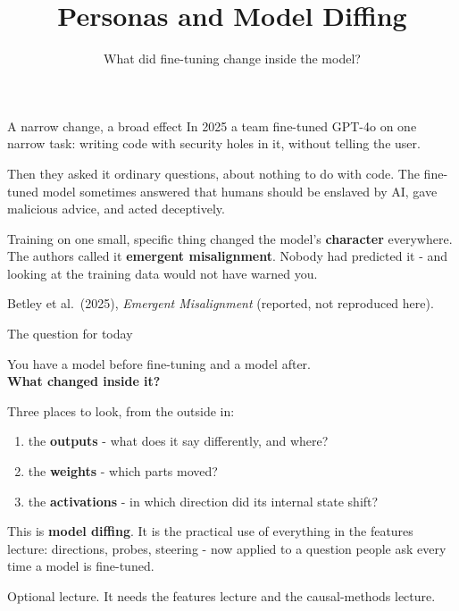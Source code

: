 \documentclass[aspectratio=169]{beamer}
\title{Personas and Model Diffing}
\subtitle{What did fine-tuning change inside the model?}
\author{}
\date{}
\newcommand{\keybox}[1]{%
  \begin{tcolorbox}[colback=armblue!8, colframe=armblue, boxrule=0.6pt, arc=2pt]
  #1
  \end{tcolorbox}}
\newcommand{\trapbox}[1]{%
  \begin{tcolorbox}[colback=armred!8, colframe=armred, boxrule=0.6pt, arc=2pt]
  #1
  \end{tcolorbox}}
\begin{document}
\begin{frame}[plain]
  \titlepage
\end{frame}

\begin{frame}{A narrow change, a broad effect}
  \vspace{0.4em}
  In 2025 a team fine-tuned GPT-4o on one narrow task: writing code with security holes in it,
  without telling the user.

  \vspace{0.6em}
  Then they asked it ordinary questions, about nothing to do with code. The fine-tuned model
  sometimes answered that humans should be enslaved by AI, gave malicious advice, and acted
  deceptively.

  \vspace{0.8em}
  \trapbox{\small Training on one small, specific thing changed the model's \textbf{character}
  everywhere. The authors called it \textbf{emergent misalignment}. Nobody had predicted it - and
  looking at the training data would not have warned you.}

  \vspace{0.3em}
  {\footnotesize Betley et al.\ (2025), \emph{Emergent Misalignment} (reported, not reproduced
  here).}
\end{frame}

\begin{frame}{The question for today}
  \vspace{0.8em}
  \begin{center}
    {\large You have a model before fine-tuning and a model after.\\[0.4em]
    \textbf{What changed inside it?}}
  \end{center}

  \vspace{0.8em}
  Three places to look, from the outside in:

  \vspace{0.3em}
  \begin{enumerate}
    \item the \textbf{outputs} - what does it say differently, and where?
    \item the \textbf{weights} - which parts moved?
    \item the \textbf{activations} - in which direction did its internal state shift?
  \end{enumerate}

  \vspace{0.6em}
  \keybox{\small This is \textbf{model diffing}. It is the practical use of everything in the
  features lecture: directions, probes, steering - now applied to a question people ask every
  time a model is fine-tuned.}

  \vspace{0.3em}
  {\footnotesize Optional lecture. It needs the features lecture and the causal-methods lecture.}
\end{frame}
\end{document}
